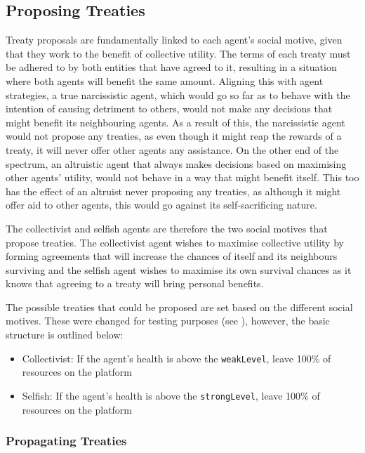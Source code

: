 \subsection{Proposing Treaties}\label{proposing_treaties}


Treaty proposals are fundamentally linked to each agent's social motive, given that they work to the benefit of collective utility. The terms of each treaty must be adhered to by both entities that have agreed to it, resulting in a situation where both agents will benefit the same amount. Aligning this with agent strategies, a true narcissistic agent, which would go so far as to behave with the intention of causing detriment to others, would not make any decisions that might benefit its neighbouring agents. As a result of this, the narcissistic agent would not propose any treaties, as even though it might reap the rewards of a treaty, it will never offer other agents any assistance. On the other end of the spectrum, an altruistic agent that always makes decisions based on maximising other agents' utility, would not behave in a way that might benefit itself. This too has the effect of an altruist never proposing any treaties, as although it might offer aid to other agents, this would go against its self-sacrificing nature.

The collectivist and selfish agents are therefore the two social motives that propose treaties. The collectivist agent wishes to maximise collective utility by forming agreements that will increase the chances of itself and its neighbours surviving and the selfish agent wishes to maximise its own survival chances as it knows that agreeing to a treaty will bring personal benefits.

The possible treaties that could be proposed are set based on the different social motives. These were changed for testing purposes (see ), however, the basic structure is outlined below:
\begin{itemize}
    \item Collectivist: If the agent's health is above the \texttt{weakLevel}, leave 100\% of resources on the platform
    \item Selfish: If the agent's health is above the \texttt{strongLevel}, leave 100\% of resources on the platform
\end{itemize}

\subsubsection{Propagating Treaties}

